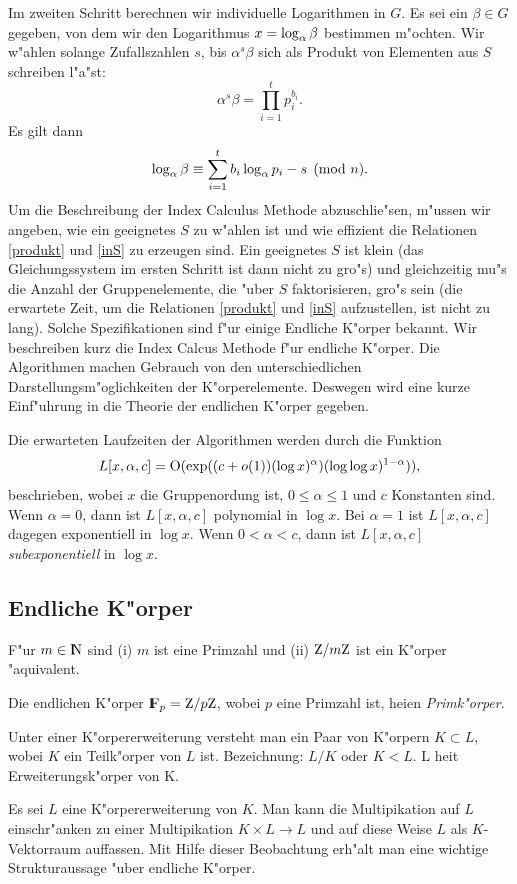 Im zweiten Schritt berechnen wir individuelle Logarithmen in $G$.
Es sei ein $\beta\in G$ gegeben, von dem wir den Logarithmus 
$x=\log_{\alpha} \beta$ bestimmen m"ochten. Wir w"ahlen solange Zufallszahlen
$s$, bis $\alpha^s\beta$ sich als Produkt von Elementen aus $S$ schreiben
l"a"st:
\begin{equation}
  \alpha^s\beta = \prod_{i=1}^t p_i^{b_i}. \label{inS}
\end{equation}
Es gilt dann
$$ \log_{\alpha} \beta \equiv \sum_{i=1}^t b_i\log_{\alpha} p_i - s
   \pmod{n}. $$
Um die Beschreibung der Index Calculus Methode abzuschlie"sen, m"ussen wir
angeben, wie ein geeignetes $S$ zu w"ahlen ist und wie effizient die
Relationen \ref{produkt} und \ref{inS} zu erzeugen sind. Ein geeignetes
$S$ ist klein (das Gleichungssystem im ersten Schritt ist dann nicht zu
gro"s) und gleichzeitig mu"s die Anzahl der Gruppenelemente, die "uber
$S$ faktorisieren, gro"s sein (die erwartete Zeit, um die Relationen
\ref{produkt} und \ref{inS} aufzustellen, ist nicht zu lang). Solche Spezifikationen
sind f"ur einige Endliche K"orper bekannt. Wir beschreiben kurz die
Index Calcus Methode f"ur endliche K"orper. Die Algorithmen machen Gebrauch 
von den unterschiedlichen Darstellungsm"oglichkeiten der K"orperelemente. 
Deswegen wird eine kurze Einf"uhrung in die Theorie der endlichen K"orper
gegeben.

Die erwarteten Laufzeiten der Algorithmen werden durch die Funktion
$$ L[x,\alpha,c] = \mbox{{\cal O}}(\exp((c+o(1))(\log x)^\alpha)
   (\log\log x)^{1-\alpha})), $$
beschrieben, wobei $x$ die Gruppenordung ist, $0\le\alpha\le 1$ und $c$ Konstanten sind.
Wenn $\alpha = 0$, dann ist $L[x,\alpha,c]$ polynomial in
$\log x$. Bei $\alpha = 1$ ist $L[x,\alpha,c]$ dagegen exponentiell in
$\log x$. Wenn $0 < \alpha < c$, dann ist $L[x,\alpha,c]$ 
{\em subexponentiell} in $\log x$.

\subsection{Endliche K"orper}

  \begin{satz}
    F"ur $m\in\N$ sind 
    (i)  $m$ ist eine Primzahl und (ii) $\Z/m\Z$ ist ein K"orper 
    "aquivalent.
  \end{satz}
  Die endlichen K"orper $\koerper{p} = \Z/p\Z$, wobei $p$ eine Primzahl ist,
  hei\3en {\em Primk"orper}.

  \begin{definition}[K"orpererweiterung]
    Unter einer K"orpererweiterung versteht man ein Paar von K"orpern 
    $K \subset L$, wobei $K$ ein Teilk"orper von $L$ ist. Bezeichnung: $L/K$
    oder $K<L$. L hei\3t Erweiterungsk"orper von K.
  \end{definition}
  Es sei $L$ eine K"orpererweiterung von $K$. Man kann die Multipikation
  auf $L$ einschr"anken zu einer Multipikation $K \times L \rightarrow L$  
  und auf diese Weise $L$ als $K$-Vektorraum auffassen. Mit Hilfe dieser
  Beobachtung erh"alt man eine wichtige Strukturaussage "uber endliche
  K"orper. 

